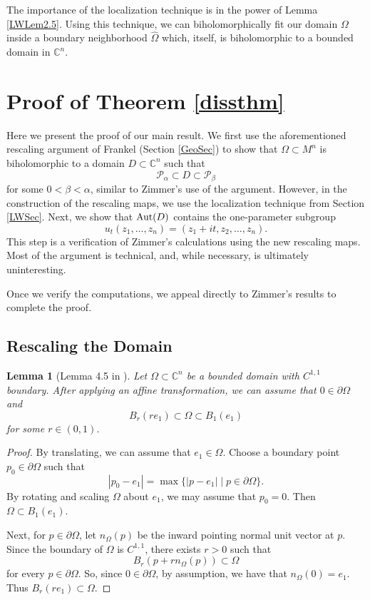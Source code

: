\documentclass[12pt]{article}
\newcommand{\C}{\mathbb{C}}
\newcommand{\Aut}{\textup{Aut}}
\newtheorem{lemma}{Lemma}[section]
\begin{document}
The importance of the localization technique is in the power of Lemma \ref{LWLem2.5}. Using this technique, we can biholomorphically fit our domain $\Omega$ inside a boundary neighborhood $\widehat{\Omega}$ which, itself, is biholomorphic to a bounded domain in $\C^n$.


\section{Proof of Theorem \ref{dissthm}}
\label{ProofSec}

Here we present the proof of our main result. We first use the aforementioned rescaling argument of Frankel (Section \ref{GeoSec}) to show that $\Omega\subset M^n$ is biholomorphic to a domain $D\subset\C^n$ such that     
$$\mathcal{P}_{\alpha}\subset D\subset\mathcal{P}_{\beta}$$
for some $0<\beta<\alpha$, similar to Zimmer's use of the argument. However, in the construction of the rescaling maps, we use the localization technique from Section \ref{LWSec}. Next, we show that $\Aut(D)$ contains the one-parameter subgroup
$$u_t(z_1,\dots,z_n)=(z_1+it,z_2,\dots,z_n).$$
This step is a verification of Zimmer's calculations using the new rescaling maps. Most of the argument is technical, and, while necessary, is ultimately uninteresting.

Once we verify the computations, we appeal directly to Zimmer's results to complete the proof. 


\subsection{Rescaling the Domain}

\begin{lemma}[Lemma 4.5 in \cite{Zimmer}]
\label{ZimLem4.5}
Let $\Omega\subset\C^n$ be a bounded domain with $C^{1,1}$ boundary.  After applying an affine transformation, we can assume that $0\in\partial\Omega$ and
$$B_r(re_1)\subset\Omega\subset B_1(e_1)$$
for some $r\in(0,1)$.
\end{lemma}
\begin{proof}
By translating, we can assume that $e_1\in\Omega$. Choose a boundary point $p_0\in\partial\Omega$ such that 
$$|p_0-e_1|=\max\{|p-e_1| \mid p\in\partial\Omega\}.$$
By rotating and scaling $\Omega$ about $e_1$, we may assume that $p_0=0$. Then $\Omega\subset B_1(e_1)$.

Next, for $p\in\partial\Omega$, let $n_{\Omega}(p)$ be the inward pointing normal unit vector at $p$. Since the boundary of $\Omega$ is $C^{1,1}$, there exists $r>0$ such that 
$$B_r(p+rn_{\Omega}(p))\subset\Omega$$
for every $p\in\partial\Omega$. So, since $0\in\partial\Omega$, by assumption, we have that $n_{\Omega}(0)=e_1$. Thus $B_r(re_1)\subset\Omega$.
\end{proof}
\end{document}
